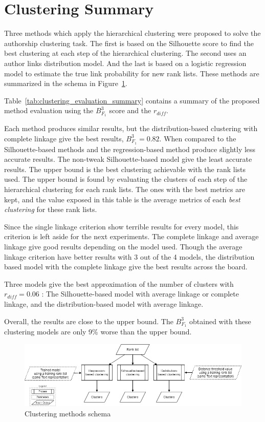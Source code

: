 \section{Clustering Summary}

Three methods which apply the hierarchical clustering were proposed to solve the authorship clustering task.
The first is based on the Silhouette score to find the best clustering at each step of the hierarchical clustering.
The second uses an author links distribution model.
And the last is based on a logistic regression model to estimate the true link probability for new rank lists.
These methods are summarized in the schema in Figure~\ref{fig:schema-clustering}.

Table~\ref{tab:clustering_evaluation_summary} contains a summary of the proposed method evaluation using the $B^3_{F_1}$ score and the $r_{diff}$.

Each method produces similar results, but the distribution-based clustering with complete linkage give the best results, $B^3_{F_1} = 0.82$.
When compared to the Silhouette-based methods and the regression-based method produce slightly less accurate results.
The non-tweak Silhouette-based model give the least accurate results.
The upper bound is the best clustering achievable with the rank lists used.
The upper bound is found by evaluating the clusters of each step of the hierarchical clustering for each rank lists.
The ones with the best metrics are kept, and the value exposed in this table is the average metrics of each \textit{best clustering} for these rank lists.

Since the single linkage criterion show terrible results for every model, this criterion is left aside for the next experiments.
The complete linkage and average linkage give good results depending on the model used.
Though the average linkage criterion have better results with 3 out of the 4 models, the distribution based model with the complete linkage give the best results across the board.

Three models give the best approximation of the number of clusters with $r_{diff} = 0.06$ :
The Silhouette-based model with average linkage or complete linkage, and the distribution-based model with average linkage.

Overall, the results are close to the upper bound.
The $B^{3}_{F_1}$ obtained with these clustering models are only 9\% worse than the upper bound.

\begin{figure}
  \centering
  \caption{Clustering methods schema}
  \label{fig:schema-clustering}
  \includegraphics[width=1\linewidth]{img/schema-clustering.png}
\end{figure}

